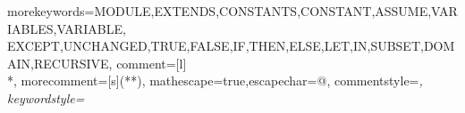 \usepackage{mathpartir}
\usepackage{amsthm}
\usepackage{amsmath}
\usepackage{amssymb}
\usepackage{mathtools}
\usepackage{listings}
\usepackage{tlalatex}

\newcommand{\SpecOne}{\texttt{Spec~1}}
\newcommand{\SpecTwo}{\texttt{Spec~2}}
\newcommand{\SpecThree}{\texttt{Spec~3}}
\newcommand{\SpecFour}{\texttt{Spec~4}}
\lstset{
    basicstyle=\sffamily\scriptsize,   %
    columns=fullflexible,   %
    frame=single,           %
}

  {morekeywords={MODULE,EXTENDS,CONSTANTS,CONSTANT,ASSUME,VARIABLES,VARIABLE,
          EXCEPT,UNCHANGED,TRUE,FALSE,IF,THEN,ELSE,LET,IN,SUBSET,DOMAIN,RECURSIVE},
          comment=[l]{\\*},
  morecomment=[s]{(*}{*)},
  mathescape=true,escapechar={@},
  commentstyle=\itshape\rmfamily,%
  keywordstyle=\sffamily\bfseries
}
